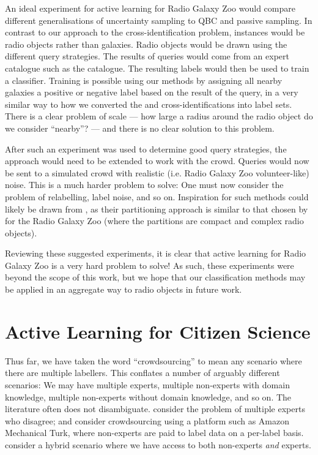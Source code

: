     An ideal experiment for active learning for Radio Galaxy Zoo would compare
    different generalisations of uncertainty sampling to QBC and passive
    sampling. In contrast to our approach to the cross-identification problem,
    instances would be radio objects rather than galaxies. Radio objects would
    be drawn using the different query strategies. The results of queries would
    come from an expert catalogue such as the \citeauthor{norris06} catalogue.
    The resulting labels would then be used to train a classifier. Training is
    possible using our methods by assigning all nearby galaxies a positive or
    negative label based on the result of the query, in a very similar way to
    how we converted the \citeauthor{norris06} and \citeauthor{fan15}
    cross-identifications into label sets. There is a clear problem of scale ---
    how large a radius around the radio object do we consider ``nearby''? ---
    and there is no clear solution to this problem.

    After such an experiment was used to determine good query strategies, the
    approach would need to be extended to work with the crowd. Queries would now
    be sent to a simulated crowd with realistic (i.e. Radio Galaxy Zoo
    volunteer-like) noise. This is a much harder problem to solve: One must now
    consider the problem of relabelling, label noise, and so on. Inspiration for
    such methods could likely be drawn from \citet{mozafari12}, as their
    partitioning approach is similar to that chosen by \citet{banfield15} for
    the Radio Galaxy Zoo (where the partitions are compact and complex radio
    objects).

    Reviewing these suggested experiments, it is clear that active learning for
    Radio Galaxy Zoo is a very hard problem to solve! As such, these experiments
    were beyond the scope of this work, but we hope that our classification
    methods may be applied in an aggregate way to radio objects in future work.

\section{Active Learning for Citizen Science}
\label{sec:al-citizen-science}
    
    Thus far, we have taken the word ``crowdsourcing'' to mean any scenario
    where there are multiple labellers. This conflates a number of arguably
    different scenarios: We may have multiple experts, multiple non-experts with
    domain knowledge, multiple non-experts without domain knowledge, and so on.
    The literature often does not disambiguate. \citet{raykar10} consider the
    problem of multiple experts who disagree; \citet{yan10} and
    \citet{mozafari12} consider crowdsourcing using a platform such as Amazon
    Mechanical Turk, where non-experts are paid to label data on a per-label
    basis. \citet{nguyen15} consider a hybrid scenario where we have access to
    both non-experts \emph{and} experts.

